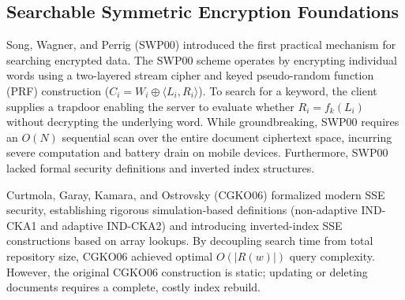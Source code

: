 \documentclass[10pt,conference]{IEEEtran}
\begin{document}
\subsection{Searchable Symmetric Encryption Foundations}
Song, Wagner, and Perrig (SWP00) \cite{song2000} introduced the first practical mechanism for searching encrypted data. The SWP00 scheme operates by encrypting individual words using a two-layered stream cipher and keyed pseudo-random function (PRF) construction ($C_i = W_i \oplus \langle L_i, R_i \rangle$). To search for a keyword, the client supplies a trapdoor enabling the server to evaluate whether $R_i = f_k(L_i)$ without decrypting the underlying word. While groundbreaking, SWP00 requires an $O(N)$ sequential scan over the entire document ciphertext space, incurring severe computation and battery drain on mobile devices. Furthermore, SWP00 lacked formal security definitions and inverted index structures.

Curtmola, Garay, Kamara, and Ostrovsky (CGKO06) \cite{curtmola2006} formalized modern SSE security, establishing rigorous simulation-based definitions (non-adaptive IND-CKA1 and adaptive IND-CKA2) and introducing inverted-index SSE constructions based on array lookups. By decoupling search time from total repository size, CGKO06 achieved optimal $O(|R(w)|)$ query complexity. However, the original CGKO06 construction is static; updating or deleting documents requires a complete, costly index rebuild.
\end{document}
